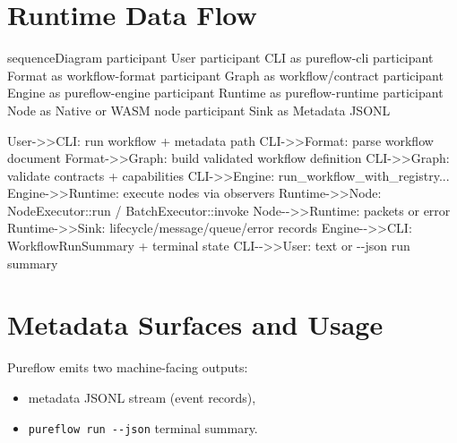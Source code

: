 \documentclass[
  letterpaper,
]{report}
\newenvironment{Shaded}{\begin{snugshade}}{\end{snugshade}}
\newcommand{\NormalTok}[1]{\textcolor[rgb]{0.00,0.23,0.31}{#1}}
\providecommand{\tightlist}{%
  \setlength{\itemsep}{0pt}\setlength{\parskip}{0pt}}
\begin{document}
\section{Runtime Data Flow}\label{runtime-data-flow}

\begin{Shaded}
\begin{Highlighting}[]
\NormalTok{sequenceDiagram}
\NormalTok{    participant User}
\NormalTok{    participant CLI as pureflow{-}cli}
\NormalTok{    participant Format as workflow{-}format}
\NormalTok{    participant Graph as workflow/contract}
\NormalTok{    participant Engine as pureflow{-}engine}
\NormalTok{    participant Runtime as pureflow{-}runtime}
\NormalTok{    participant Node as Native or WASM node}
\NormalTok{    participant Sink as Metadata JSONL}

\NormalTok{    User{-}\textgreater{}\textgreater{}CLI: run workflow + metadata path}
\NormalTok{    CLI{-}\textgreater{}\textgreater{}Format: parse workflow document}
\NormalTok{    Format{-}\textgreater{}\textgreater{}Graph: build validated workflow definition}
\NormalTok{    CLI{-}\textgreater{}\textgreater{}Graph: validate contracts + capabilities}
\NormalTok{    CLI{-}\textgreater{}\textgreater{}Engine: run\_workflow\_with\_registry...}
\NormalTok{    Engine{-}\textgreater{}\textgreater{}Runtime: execute nodes via observers}
\NormalTok{    Runtime{-}\textgreater{}\textgreater{}Node: NodeExecutor::run / BatchExecutor::invoke}
\NormalTok{    Node{-}{-}\textgreater{}\textgreater{}Runtime: packets or error}
\NormalTok{    Runtime{-}\textgreater{}\textgreater{}Sink: lifecycle/message/queue/error records}
\NormalTok{    Engine{-}{-}\textgreater{}\textgreater{}CLI: WorkflowRunSummary + terminal state}
\NormalTok{    CLI{-}{-}\textgreater{}\textgreater{}User: text or {-}{-}json run summary}
\end{Highlighting}
\end{Shaded}

\section{Metadata Surfaces and Usage}\label{metadata-surfaces-and-usage}

Pureflow emits two machine-facing outputs:

\begin{itemize}
\tightlist
\item
  metadata JSONL stream (event records),
\item
  \texttt{pureflow\ run\ -\/-json} terminal summary.
\end{itemize}
\end{document}
